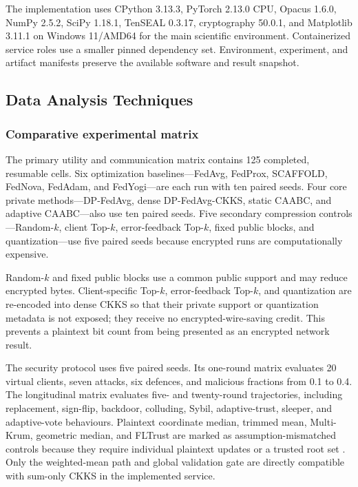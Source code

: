 The implementation uses CPython 3.13.3, PyTorch 2.13.0 CPU, Opacus 1.6.0, NumPy 2.5.2, SciPy 1.18.1, TenSEAL 0.3.17, cryptography 50.0.1, and Matplotlib 3.11.1 on Windows 11/AMD64 for the main scientific environment. Containerized service roles use a smaller pinned dependency set. Environment, experiment, and artifact manifests preserve the available software and result snapshot.

\subsection{Data Analysis Techniques}
\label{subsec:data-analysis}

\subsubsection{Comparative experimental matrix}

The primary utility and communication matrix contains 125 completed, resumable cells. Six optimization baselines---FedAvg, FedProx, SCAFFOLD, FedNova, FedAdam, and FedYogi---are each run with ten paired seeds. Four core private methods---DP-FedAvg, dense DP-FedAvg-CKKS, static CAABC, and adaptive CAABC---also use ten paired seeds. Five secondary compression controls---Random-$k$, client Top-$k$, error-feedback Top-$k$, fixed public blocks, and quantization---use five paired seeds because encrypted runs are computationally expensive.

Random-$k$ and fixed public blocks use a common public support and may reduce encrypted bytes. Client-specific Top-$k$, error-feedback Top-$k$, and quantization are re-encoded into dense CKKS so that their private support or quantization metadata is not exposed; they receive no encrypted-wire-saving credit. This prevents a plaintext bit count from being presented as an encrypted network result.

The security protocol uses five paired seeds. Its one-round matrix evaluates 20 virtual clients, seven attacks, six defences, and malicious fractions from 0.1 to 0.4. The longitudinal matrix evaluates five- and twenty-round trajectories, including replacement, sign-flip, backdoor, colluding, Sybil, adaptive-trust, sleeper, and adaptive-vote behaviours. Plaintext coordinate median, trimmed mean, Multi-Krum, geometric median, and FLTrust are marked as assumption-mismatched controls because they require individual plaintext updates or a trusted root set \cite{blanchard2017krum,yin2018byzantine,pillutla2022robust,cao2021fltrust}. Only the weighted-mean path and global validation gate are directly compatible with sum-only CKKS in the implemented service.

